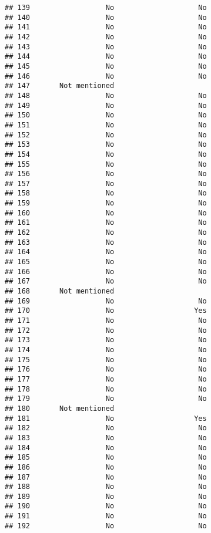 \documentclass[
]{article}
\begin{document}
\begin{verbatim}
## 139                  No                    No
## 140                  No                    No
## 141                  No                    No
## 142                  No                    No
## 143                  No                    No
## 144                  No                    No
## 145                  No                    No
## 146                  No                    No
## 147       Not mentioned                      
## 148                  No                    No
## 149                  No                    No
## 150                  No                    No
## 151                  No                    No
## 152                  No                    No
## 153                  No                    No
## 154                  No                    No
## 155                  No                    No
## 156                  No                    No
## 157                  No                    No
## 158                  No                    No
## 159                  No                    No
## 160                  No                    No
## 161                  No                    No
## 162                  No                    No
## 163                  No                    No
## 164                  No                    No
## 165                  No                    No
## 166                  No                    No
## 167                  No                    No
## 168       Not mentioned                      
## 169                  No                    No
## 170                  No                   Yes
## 171                  No                    No
## 172                  No                    No
## 173                  No                    No
## 174                  No                    No
## 175                  No                    No
## 176                  No                    No
## 177                  No                    No
## 178                  No                    No
## 179                  No                    No
## 180       Not mentioned                      
## 181                  No                   Yes
## 182                  No                    No
## 183                  No                    No
## 184                  No                    No
## 185                  No                    No
## 186                  No                    No
## 187                  No                    No
## 188                  No                    No
## 189                  No                    No
## 190                  No                    No
## 191                  No                    No
## 192                  No                    No

\end{verbatim}
\end{document}
